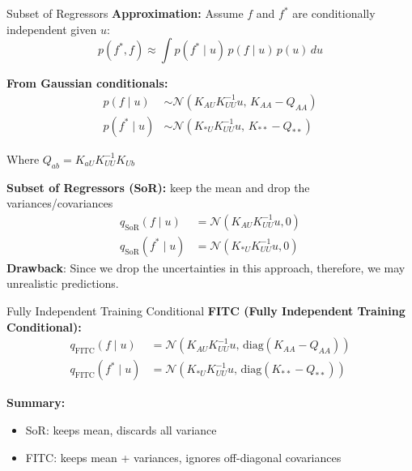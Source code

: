 \documentclass[handout,aspectratio=169]{beamer}
\begin{document}
\begin{frame}{Subset of Regressors}
\textbf{Approximation:} Assume $f$ and $f^*$ are conditionally independent given $u$:
\[
p(f^*, f) \approx \int p(f^* \mid u) \, p(f \mid u) \, p(u) \, du \tag{4.46}
\]

\pause
\textbf{From Gaussian conditionals:}
\begin{align*}
p(f \mid u) &\sim \mathcal{N}(K_{AU} K_{UU}^{-1} u, \, K_{AA} - Q_{AA}) \tag{4.47a} \\
p(f^* \mid u) &\sim \mathcal{N}(K_{\ast U} K_{UU}^{-1} u, \, K_{\ast\ast} - Q_{\ast\ast}) \tag{4.47b}
\end{align*}

Where $Q_{ab} = K_{aU} K_{UU}^{-1} K_{Ub}$

\pause
\textbf{Subset of Regressors (SoR):} keep the mean and drop the variances/covariances
\begin{align*}
q_{\text{SoR}}(f \mid u) &= \mathcal{N}(K_{AU}K_{UU}^{-1}u, 0) \tag{4.48a} \\
q_{\text{SoR}}(f^* \mid u) &= \mathcal{N}(K_{\ast U}K_{UU}^{-1}u, 0) \tag{4.48b}
\end{align*}
\textbf{Drawback}: Since we drop the uncertainties in this approach, therefore, we may unrealistic predictions.
\end{frame}

\begin{frame}{Fully Independent Training Conditional}
\pause
\textbf{FITC (Fully Independent Training Conditional):}
\begin{align*}
q_{\text{FITC}}(f \mid u) &= \mathcal{N}(K_{AU}K_{UU}^{-1}u, \, \text{diag}(K_{AA} - Q_{AA})) \tag{4.49a} \\
q_{\text{FITC}}(f^* \mid u) &= \mathcal{N}(K_{\ast U}K_{UU}^{-1}u, \, \text{diag}(K_{\ast\ast} - Q_{\ast\ast})) \tag{4.49b}
\end{align*}

\pause
\textbf{Summary:}
\begin{itemize}
    \item SoR: keeps mean, discards all variance
    \item FITC: keeps mean + variances, ignores off-diagonal covariances
\end{itemize}
\end{frame}
\end{document}
